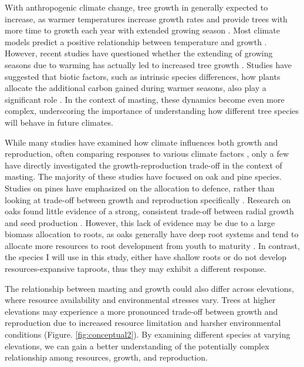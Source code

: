 \documentclass[11pt,letter]{article}
\begin{document}
With anthropogenic climate change, tree growth in generally expected to increase, as warmer temperatures increase growth rates and provide trees with more time to growth each year with extended growing season \citep{keenan2014net, finzi2020carbon}. Most climate models predict a positive relationship between temperature and growth \citep{friedlingstein2022global, ito2020global}. However, recent studies have questioned whether the extending of growing seasons due to warming has actually led to increased tree growth \citep{dow2022warm, green2022limits}. Studies have suggested that biotic factors, such as intrinsic species differences, how plants allocate the additional carbon gained during warmer seasons, also play a significant role \citep{hacket2016consistent}. In the context of masting, these dynamics become even more complex, underscoring the importance of understanding how different tree species will behave in future climates.\par

While many studies have examined how climate influences both growth and reproduction, often comparing responses to various climate factors \citep{bajocco2021characterizing, koenig2020can, redmond2019resource, sanchez2011trade}, only a few have directly investigated the growth-reproduction trade-off in the context of masting. The majority of these studies have focused on oak and pine species. Studies on pines have emphasized on the allocation to defence, rather than looking at trade-off between growth and reproduction specifically \citep{larrinaga2024resource, redmond2019resource}. Research on oaks found little evidence of a strong, consistent trade-off between radial growth and seed production \citep{koenig2020can, patterson2023acorn}. However, this lack of evidence may be due to a  large biomass allocation to roots, as oaks generally have deep root systems and tend to allocate more resources to root development from youth to maturity \citep{burns1990silvics}. In contrast, the species I will use in this study, either have shallow roots or do not develop resources-expansive taproots, thus they may exhibit a different response.\par

The relationship between masting and growth could also differ across elevations, where resource availability and environmental stresses vary. Trees at higher elevations may experience a more pronounced trade-off between growth and reproduction due to increased resource limitation and harsher environmental conditions (Figure. \ref{fig:conceptual2}). By examining different species at varying elevations, we can gain a better understanding of the potentially complex relationship among resources, growth, and reproduction.\par
\end{document}
